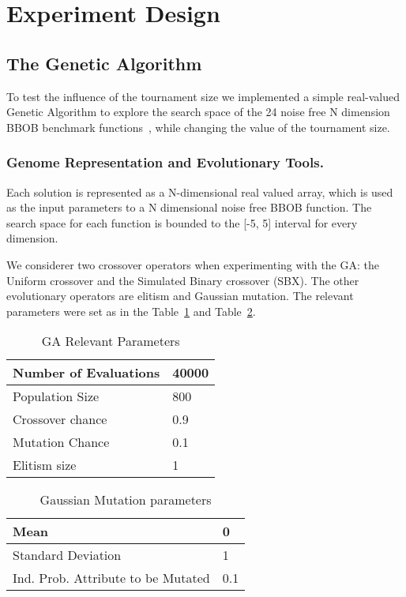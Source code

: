 \section{Experiment Design}

\subsection{The Genetic Algorithm}\label{sec:proposed:ga}

To test the influence of the tournament size we implemented a simple
real-valued Genetic Algorithm to explore the search space of the 24
noise free N dimension BBOB benchmark functions~\cite{hansen2010real},
while changing the value of the tournament size.

\subsubsection*{Genome Representation and Evolutionary Tools.}

Each solution is represented as a N-dimensional real valued array,
which is used as the input parameters to a N dimensional noise free
BBOB function.  The search space for each function is bounded to the
[-5, 5] interval for every dimension.

We considerer two crossover operators when experimenting with the GA:
the Uniform crossover and the Simulated Binary crossover (SBX). The
other evolutionary operators are elitism and Gaussian mutation. The
relevant parameters were set as in the Table~\ref{relevant_par} and
Table~\ref{gaussian_par}.

\vspace{3mm}
\begin{table}[!ht]
	\centering
	\begin{tabular}{|l|l|}
	\hline
	Number of Evaluations & 40000 \\ \hline
	Population Size &  800		\\ \hline
	Crossover chance 	& 0.9	\\ \hline
	Mutation Chance 	& 0.1	\\ \hline		
	Elitism size 		& 1		\\ \hline		
	\end{tabular}
	\caption{GA Relevant Parameters}
	\label{relevant_par}
\end{table}
	\vspace{-2mm}
%
\begin{table}[!ht]
	\centering
	\begin{tabular}{|l|l|}
	\hline
		Mean & 0 \\ \hline		
		Standard Deviation & 1 \\ \hline		
		Ind. Prob. Attribute to be Mutated &  0.1 \\ \hline		
	\end{tabular}
	\caption{Gaussian Mutation parameters}
	\label{gaussian_par}
\end{table}


